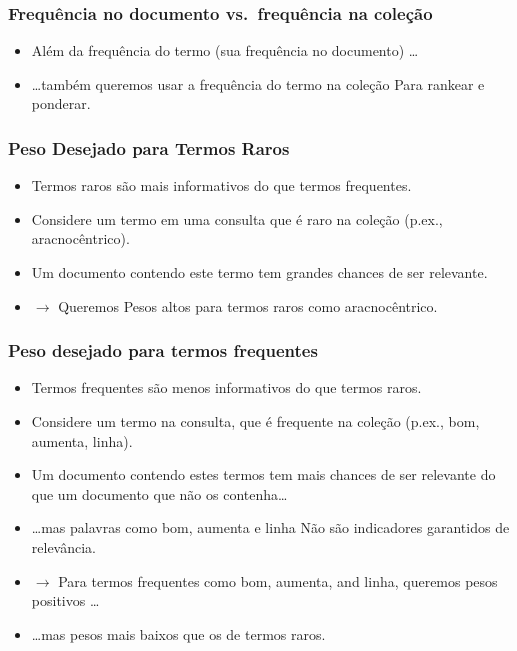 \documentclass[compress]{beamer}
\def\myblue#1{\textcolor{texblue}{#1}}
\def\term#1{{\sc #1}}   %
\begin{document}
\begin{frame}[<+->]
\frametitle{Frequência no documento vs.\ frequência na coleção}
\pause[2]
\begin{itemize}
\item Além da frequência do termo (sua frequência no documento) \ldots
\item \ldots também queremos usar a frequência do termo \myblue{na coleção} Para rankear e ponderar.
\end{itemize}
\end{frame}

\begin{frame}[<+->]
\frametitle{Peso Desejado para Termos Raros}
\pause[2]
\begin{itemize}
\item Termos raros são mais informativos do que termos frequentes.
\item Considere um termo em uma consulta que é \myblue{raro} na coleção (p.ex.,   \term{aracnocêntrico}).
\item Um documento contendo este termo tem grandes chances de ser relevante. 
\item $\rightarrow$ Queremos \myblue{Pesos altos para termos raros} como \term{aracnocêntrico}.
\end{itemize}
\end{frame}

\begin{frame}[<+->]
\frametitle{Peso desejado para termos frequentes}
\pause[2]
\begin{itemize}
\item Termos frequentes são menos informativos do que termos raros.
\item Considere um termo na consulta, que é \myblue{frequente} na coleção (p.ex.,   \term{bom}, \term{aumenta}, \term{linha}).
\item Um documento contendo estes termos tem mais chances de ser relevante do que um documento que não os contenha\ldots
\item \ldots mas palavras como \term{bom}, \term{aumenta} e
  \term{linha} Não são indicadores garantidos de relevância.
\item $\rightarrow$ \myblue{Para termos frequentes} como
\term{bom}, \term{aumenta}, and \term{linha},
 queremos pesos positivos \ldots
\item \ldots mas \myblue{pesos mais baixos} que os de termos raros.
\end{itemize}
\end{frame}
\end{document}
